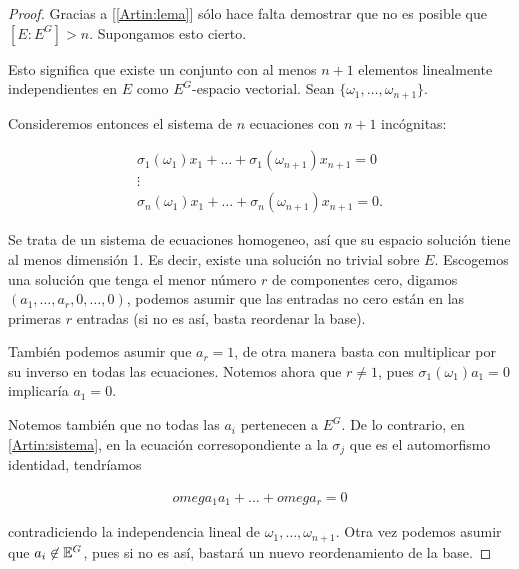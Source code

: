 \begin{proof}
    Gracias a [\ref{Artin:lema}] sólo hace falta demostrar que no es posible que $[E : E^G] > n$.
    Supongamos esto cierto.\par\null
        
    Esto significa que existe un conjunto con al menos $n+1$ elementos linealmente independientes en $E$ como
    $E^G$-espacio vectorial. Sean $\{ \omega_1, \dots, \omega_{n+1} \}$.\par\null
    
    Consideremos entonces el sistema de $n$ ecuaciones con $n+1$ incógnitas:
    
    \begin{align}\label{Artin:sistema}
        \sigma_1(\omega_1)x_1   +   \dots   +   \sigma_1(\omega_{n+1})x_{n+1}   =   0       \\
                                                                                    \vdots  \\
        \sigma_n(\omega_1)x_1   +   \dots   +   \sigma_n(\omega_{n+1})x_{n+1}   =   0.     
    \end{align}\par\null
    
    Se trata de un sistema de ecuaciones homogeneo, así que su espacio solución tiene al menos dimensión 1. 
    Es decir, existe una solución no trivial  sobre $E$. Escogemos una solución
    que tenga el menor número $r$ de componentes cero, digamos $(a_1, \dots, a_r, 0, \dots, 0)$, podemos
    asumir que las entradas no cero están en las primeras $r$ entradas (si no es así, basta reordenar la base).\par\null
    
    También podemos asumir que $a_r = 1$, de otra manera basta con multiplicar por su inverso en todas las ecuaciones.
    Notemos ahora que $r \not= 1$, pues $\sigma_1(\omega_1)a_1 = 0$ implicaría $a_1 = 0$.\par\null
    
    Notemos también que no todas las $a_i$ pertenecen a $E^G$. De lo contrario, en \eqref{Artin:sistema}, en la
    ecuación corresopondiente a la $\sigma_j$ que es el automorfismo identidad, tendríamos
    
    \begin{align}
        omega_1 a_1   +   \dots + omega_r  =   0
    \end{align}
    
    contradiciendo la independencia lineal de $\omega_1, \dots, \omega_{n+1}$. Otra vez podemos asumir que $a_i \not\in \mathbb{E}^G$,
    pues si no es así, bastará un nuevo reordenamiento de la base.\par\null
    

\end{proof}
